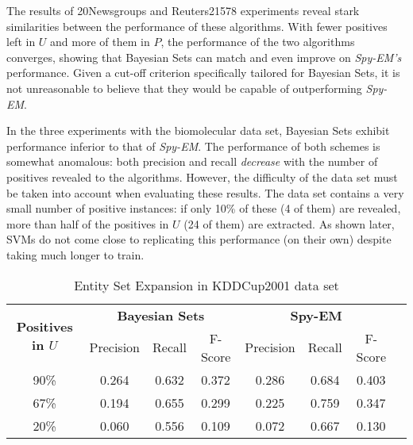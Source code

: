 \documentclass[12pt,twoside,notitlepage,amsart]{report} %
\begin{document}
	The results of 20Newsgroups and Reuters21578 experiments reveal stark similarities between the performance of these algorithms. With fewer positives left in $U$ and more of them in $P$, the performance of the two algorithms converges, showing that Bayesian Sets can match and even improve on \emph{Spy-EM's} performance. Given a cut-off criterion specifically tailored for Bayesian Sets, it is not unreasonable to believe that they would be capable of outperforming \emph{Spy-EM}. 
	
	In the three experiments with the biomolecular data set, Bayesian Sets exhibit performance inferior to that of \emph{Spy-EM}. The performance of both schemes is somewhat anomalous: both precision and recall \emph{decrease} with the number of positives revealed to the algorithms. However, the difficulty of the data set must be taken into account when evaluating these results. The data set contains a very small number of positive instances: if only 10\% of these (4 of them) are revealed, more than half of the positives in $U$ (24 of them) are extracted. As shown later, SVMs do not come close to replicating this performance (on their own) despite taking {much longer} to train. 
	
	
	\begin{table} [h]
	
	\begin{center}
	
	\caption{Entity Set Expansion in KDDCup2001 data set}
	
	\begin{tabular}{ |c| c|c|c|c | c | c | p}
	
	\hline
	
	\multirow{2}{*}{\textbf{Positives in $U$}} & \multicolumn{3}{|c|}{\textbf{Bayesian Sets}} & \multicolumn{3}{|c|}{\textbf{Spy-EM}} \\\cline{2-7}
	
	& Precision & Recall & F-Score & Precision & Recall & F-Score \\
	\hline                        
	90\% & 0.264 &	0.632	& 0.372 & 0.286 &	0.684	& 0.403 \\
	67\% & 0.194 &	0.655	& 0.299 & 0.225 &	0.759 &	0.347 \\
	20\% & 0.060 &	0.556 &	0.109 & 0.072 &	0.667 &	0.130 \\
	
	\hline  
	
	\end{tabular}
	
	
	\end{center}
	\end{table}
	
\end{document}

